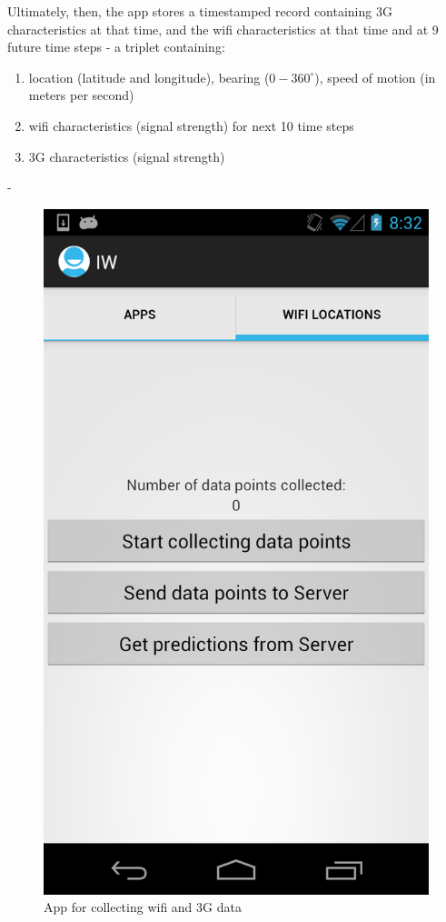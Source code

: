 \documentclass[12pt, fleqn]{article}
\begin{document}
Ultimately, then, the app stores a timestamped record containing 3G characteristics at 
that time, and the wifi characteristics at that time and at 9 future time steps - a triplet 
containing:
\begin{enumerate}
  \item location (latitude and longitude), bearing ($0-360^\circ$), speed of motion 
  (in meters per second)
  \item wifi characteristics (signal strength) for next 10 time steps 
  \item 3G characteristics (signal strength)
\end{enumerate}-

\medskip
\begin{figure}[htp]
\centering
\includegraphics[scale=0.2]{img/app-screenshot-wifi.png}
\caption{App for collecting wifi and 3G data\label{fig-app-screenshot-wifi}}
\end{figure}
\medskip
\end{document}
